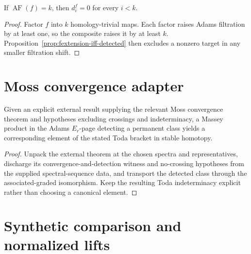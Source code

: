 \begin{corollary}
  \label{cor:fess-below-map-filtration-zero}
  \notready
  If $\operatorname{AF}(f)=k$, then $d_i^f=0$ for every $i<k$.
\end{corollary}

\begin{proof}
  Factor $f$ into $k$ homology-trivial maps.  Each factor raises Adams
  filtration by at least one, so the composite raises it by at least $k$.
  Proposition~\ref{prop:fextension-iff-detected} then excludes a nonzero
  target in any smaller filtration shift.
\end{proof}

\section{Moss convergence adapter}

\begin{theorem}
  \label{thm:moss-convergence-adapter}
  \notready
  Given an explicit external result supplying the relevant Moss convergence
  theorem and hypotheses excluding crossings and indeterminacy, a Massey
  product in the Adams $E_r$-page detecting a permanent class yields a
  corresponding element of the stated Toda bracket in stable homotopy.
\end{theorem}

\begin{proof}
  Unpack the external theorem at the chosen spectra and representatives,
  discharge its convergence-and-detection witness and no-crossing hypotheses
  from the supplied spectral-sequence data, and transport the detected class through the
  associated-graded isomorphism.  Keep the resulting Toda indeterminacy
  explicit rather than choosing a canonical element.
\end{proof}

\section{Synthetic comparison and normalized lifts}

